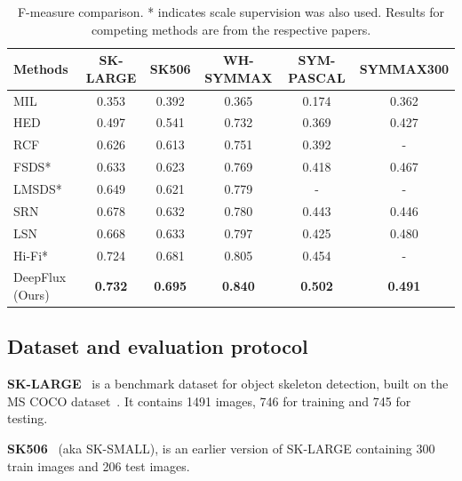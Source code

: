 \documentclass[10pt,twocolumn,letterpaper]{article}
\begin{document}
\begin{table}
\begin{center}
\begin{tabular}{|l|c|c|c|c|c|}
\hline
Methods      & SK-LARGE  & SK506  & WH-SYMMAX  &  SYM-PASCAL & SYMMAX300    \\ \hline\hline
MIL~\cite{tsogkas2012mil}  & 0.353   & 0.392  & 0.365 & 0.174 & 0.362     \\ \hline
HED~\cite{xie2015hed}  & 0.497   & 0.541  & 0.732 & 0.369 & 0.427    \\ \hline
RCF~\cite{liu2017rcf}  & 0.626   & 0.613  & 0.751 & 0.392 & -    \\ \hline
FSDS*~\cite{shen2016fsds}  & 0.633   & 0.623  & 0.769 & 0.418 & 0.467    \\ \hline
LMSDS*~\cite{shen2017lmsds} & 0.649 & 0.621 & 0.779 & - & -
\\ \hline
SRN~\cite{ke2017srn} & 0.678   & 0.632  & 0.780 & 0.443 & 0.446    \\ \hline
LSN~\cite{liu2018lsn} & 0.668   & 0.633  & 0.797 & 0.425 & 0.480    \\ \hline
Hi-Fi*~\cite{zhao2018hifi} & 0.724   & 0.681  & 0.805 & 0.454 & -    \\ \hline
DeepFlux (Ours) & \bf{0.732}  & \bf{0.695}  & \bf{0.840}  & \bf{0.502} & \bf{0.491} \\ \hline
\end{tabular}
\end{center}
\caption{F-measure comparison. * indicates scale supervision was also used. Results for competing methods are from the respective papers.}
\label{tab:quantitativeresults}
\end{table}

\subsection{Dataset and evaluation protocol}\label{sec:datasets}
\noindent\textbf{SK-LARGE}~\cite{shen2017lmsds} is a benchmark dataset for object skeleton detection, built on the MS COCO dataset~\cite{chen2015mscoco}.
It contains 1491 images, 746 for training and 745 for testing.

\medskip

\noindent\textbf{SK506}~\cite{shen2016fsds} (aka SK-SMALL), is an earlier version of SK-LARGE containing 300 train images and 206 test images.
\end{document}
